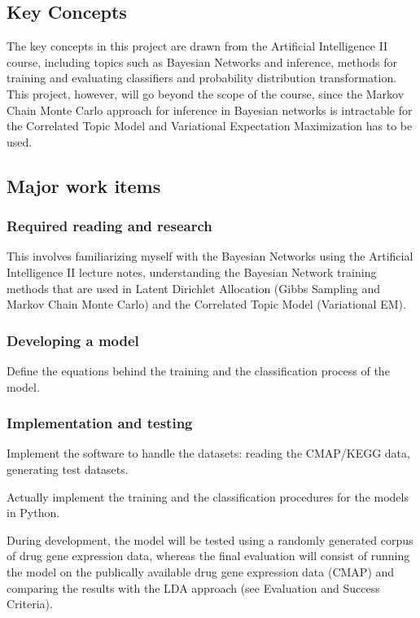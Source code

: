 \documentclass[12pt,a4]{article}
\begin{document}
\subsection*{Key Concepts}

The key concepts in this project are drawn from the Artificial Intelligence II course, including topics such as Bayesian Networks and inference, methods for training and evaluating classifiers and probability distribution transformation. This project, however, will go beyond the scope of the course, since the Markov Chain Monte Carlo approach for inference in Bayesian networks is intractable for the Correlated Topic Model and Variational Expectation Maximization has to be used.

\subsection*{Major work items}

\subsubsection*{Required reading and research}
This involves familiarizing myself with the Bayesian Networks using the Artificial Intelligence II lecture notes, understanding the Bayesian Network training methods that are used in Latent Dirichlet Allocation (Gibbs Sampling and Markov Chain Monte Carlo) and the Correlated Topic Model (Variational EM).

\subsubsection*{Developing a model}

Define the equations behind the training and the classification process of the model.

\subsubsection*{Implementation and testing}

Implement the software to handle the datasets: reading the CMAP/KEGG data, generating test datasets.

Actually implement the training and the classification procedures for the models in Python. 

During development, the model will be tested using a randomly generated corpus of drug gene expression data, whereas the final evaluation will consist of running the model on the publically available drug gene expression data (CMAP) and comparing the results with the LDA approach (see Evaluation and Success Criteria).
\end{document}
